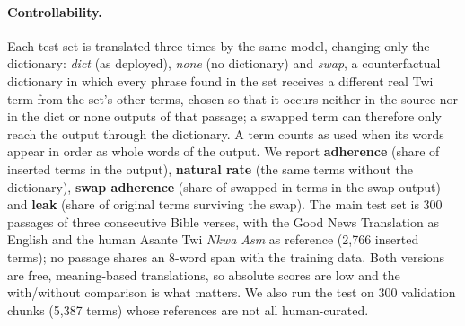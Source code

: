 \documentclass[10pt,twocolumn]{article}
\begin{document}
\paragraph{Controllability.} Each test set is translated three times by the same model, changing only the dictionary: \emph{dict} (as deployed), \emph{none} (no dictionary) and \emph{swap}, a counterfactual dictionary in which every phrase found in the set receives a different real Twi term from the set's other terms, chosen so that it occurs neither in the source nor in the dict or none outputs of that passage; a swapped term can therefore only reach the output through the dictionary. A term counts as used when its words appear in order as whole words of the output. We report \textbf{adherence} (share of inserted terms in the output), \textbf{natural rate} (the same terms without the dictionary), \textbf{swap adherence} (share of swapped-in terms in the swap output) and \textbf{leak} (share of original terms surviving the swap). The main test set is 300 passages of three consecutive Bible verses, with the Good News Translation as English and the human Asante Twi \emph{Nkwa As\textepsilon m} as reference (2,766 inserted terms); no passage shares an 8-word span with the training data. Both versions are free, meaning-based translations, so absolute scores are low and the with/without comparison is what matters. We also run the test on 300 validation chunks (5,387 terms) whose references are not all human-curated.
\end{document}

